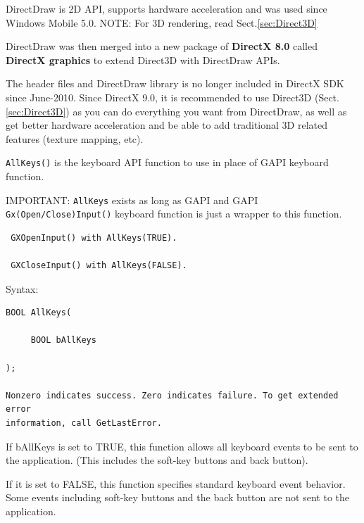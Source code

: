 DirectDraw is 2D API, supports hardware acceleration and was used since
Windows Mobile 5.0. NOTE: For 3D rendering, read Sect.\ref{sec:Direct3D}

DirectDraw was then merged into a new package of {\bf DirectX 8.0} called
{\bf DirectX graphics} to extend Direct3D with DirectDraw APIs.

The header files and DirectDraw library is no longer included in DirectX SDK
since June-2010. Since DirectX 9.0, it is recommended to use Direct3D
(Sect.\ref{sec:Direct3D}) as you can do everything you want from DirectDraw, as
well as get better hardware acceleration and be able to add traditional 3D
related features (texture mapping, etc).

\verb!AllKeys()! is the keyboard API function to use in place of GAPI keyboard
function. 

IMPORTANT: \verb!AllKeys! exists as long as GAPI and GAPI
\verb!Gx(Open/Close)Input()! keyboard function is just a wrapper to this
function.

\begin{verbatim}
 GXOpenInput() with AllKeys(TRUE).
 
 GXCloseInput() with AllKeys(FALSE).
\end{verbatim}

Syntax:
\begin{verbatim}
BOOL AllKeys(

     BOOL bAllKeys

);

Nonzero indicates success. Zero indicates failure. To get extended error
information, call GetLastError.
\end{verbatim}
If bAllKeys is set to TRUE, this function allows all keyboard events to be sent
to the application. (This includes the soft-key buttons and back button).

If it is set to FALSE, this function specifies standard keyboard event behavior.
Some events including soft-key buttons and the back button are not sent to the application.

